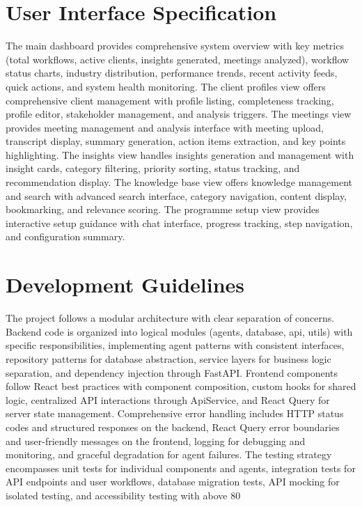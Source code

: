 \documentclass{article}
\begin{document}
\section{User Interface Specification}
The main dashboard provides comprehensive system overview with key metrics (total workflows, active clients, insights generated, meetings analyzed), workflow status charts, industry distribution, performance trends, recent activity feeds, quick actions, and system health monitoring. The client profiles view offers comprehensive client management with profile listing, completeness tracking, profile editor, stakeholder management, and analysis triggers. The meetings view provides meeting management and analysis interface with meeting upload, transcript display, summary generation, action items extraction, and key points highlighting. The insights view handles insights generation and management with insight cards, category filtering, priority sorting, status tracking, and recommendation display. The knowledge base view offers knowledge management and search with advanced search interface, category navigation, content display, bookmarking, and relevance scoring. The programme setup view provides interactive setup guidance with chat interface, progress tracking, step navigation, and configuration summary.

\section{Development Guidelines}
The project follows a modular architecture with clear separation of concerns. Backend code is organized into logical modules (agents, database, api, utils) with specific responsibilities, implementing agent patterns with consistent interfaces, repository patterns for database abstraction, service layers for business logic separation, and dependency injection through FastAPI. Frontend components follow React best practices with component composition, custom hooks for shared logic, centralized API interactions through ApiService, and React Query for server state management. Comprehensive error handling includes HTTP status codes and structured responses on the backend, React Query error boundaries and user-friendly messages on the frontend, logging for debugging and monitoring, and graceful degradation for agent failures. The testing strategy encompasses unit tests for individual components and agents, integration tests for API endpoints and user workflows, database migration tests, API mocking for isolated testing, and accessibility testing with above 80%
\end{document}
